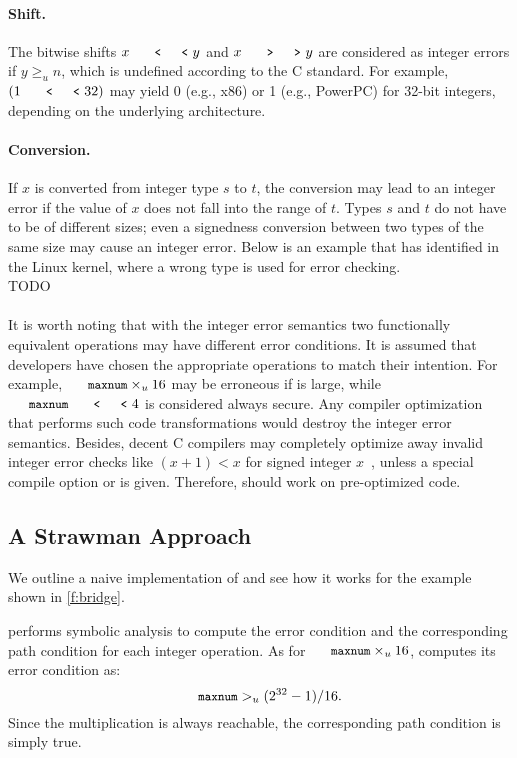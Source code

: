 \paragraph{Shift.}
The bitwise shifts $x \shl y$ and $x \shr y$ are considered as
integer errors if $y \geq_u n$, which is undefined according to the
C standard.  For example, $(1 \shl 32)$ may yield 0 (e.g., x86) or
1 (e.g., PowerPC) for 32-bit integers, depending on the underlying
architecture.

\paragraph{Conversion.}
If $x$ is converted from integer type $s$ to $t$, the conversion
may lead to an integer error if the value of $x$ does not fall into
the range of $t$.  Types $s$ and $t$ do not have to be of different
sizes; even a signedness conversion between two types of the same
size may cause an integer error.  Below is an example that \sys has
identified in the Linux kernel, where a
wrong type is used for error checking.
\\
TODO

\paragraph{}
It is worth noting that with the integer error semantics two
functionally equivalent operations may have different error conditions.
It is assumed that developers have chosen the appropriate operations
to match their intention.  For example, $\cc{maxnum}\times_u 16$
may be erroneous if  is large, while $\cc{maxnum} \shl
4$ is considered always secure.  Any compiler optimization that
performs such code transformations would destroy the integer error
semantics.  Besides, decent C compilers may completely optimize
away invalid integer error checks like $(x + 1) < x$ for signed
integer $x$~\cite{gcc:signed-overflow,us-cert:gcc}, unless a special
compile option  or  is given.
Therefore, \sys should work on pre-optimized code.

\subsection{A Strawman Approach}

We outline a naive implementation of \sys and see how it works
for the example shown in \autoref{f:bridge}.

\sys performs symbolic analysis to compute the error condition and
the corresponding path condition for each integer operation.  As
for $\cc{maxnum} \times_u 16$, \sys computes its error condition
as:
\begin{equation*}
\cc{maxnum} >_u (2^{32} - 1) / 16.
\end{equation*}
Since the multiplication is always reachable, the corresponding
path condition is simply true.

